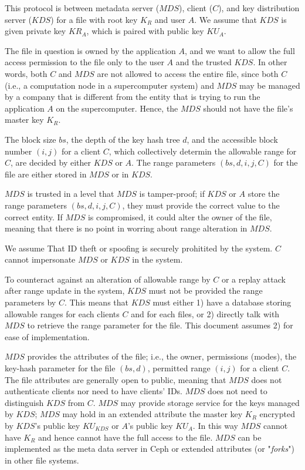 \documentclass[11pt]{article}
\newcommand{\mds}{\ensuremath{\mathit{MDS}}}
\newcommand{\kds}{\ensuremath{\mathit{KDS}}}
\begin{document}
This protocol is between metadata server ($\mds$), client ($C$), and
key distribution server ($\kds$) for a file with root key $K_R$ and
user $A$.  We assume that $\kds$ is given private key
$\textit{KR}_A$, which is paired with public key $\textit{KU}_A$.

\vspace{1ex}

The file in question is owned by the application $A$, and we want
to allow the full access permission to the file only to the
user $A$ and the trusted $\kds$.
In other words, both $C$ and $\mds$ are not
allowed to access the entire file, since both $C$ (i.e., a computation
node in a supercomputer system) and $\mds$ may be managed by a
company that is different from the entity that is trying to run
the application $A$ on the supercomputer.
Hence, the $\mds$ should not have the file's master key $K_R$.

The block size $bs$, the depth of the key hash tree $d$,
and the accessible block number $(i,j)$ for a client $C$,
which collectively determin the allowable range for $C$,
are decided by either $\kds$ or $A$.
The range parameters $(bs,d,i,j,C)$ for the file are
either stored in $\mds$ or in $\kds$.

$\mds$ is trusted in a level that $\mds$ is tamper-proof;
if $\kds$ or $A$ store the range parameters $(bs,d,i,j,C)$,
they must provide the correct value to the correct entity.
If $\mds$ is compromised, it could alter the owner of the file,
meaning that there is no point in worring about range alteration
in $\mds$.

We assume That ID theft or spoofing is securely prohitited by the system.
$C$ cannot impersonate $\mds$ or $\kds$ in the system.

To counteract against an alteration of allowable range by $C$ or
a replay attack after range update in the system,
$\kds$ must not be provided the range parameters by $C$.
This means that $\kds$ must either 1) have a database storing allowable
ranges for each clients $C$ and for each files, or
2) directly talk with $\mds$ to retrieve the range parameter for the file.
This document assumes 2) for ease of implementation.

$\mds$ provides the attributes of the file; i.e., the owner, permissions
(modes), the key-hash parameter for the file $(bs,d)$,
permitted range $(i,j)$ for a client $C$.
The file attributes are generally open to public, meaning that $\mds$
does not authenticate clients nor need to have clients' IDs.
$\mds$ does not need to distinguish $\kds$ from $C$.
$\mds$ may provide storage service for the keys managed by $\kds$;
$\mds$ may hold in an extended attribute the master key $K_R$
encrypted by $\kds$'s public key $KU_{\kds}$ or $A$'s public key $KU_{A}$.
In this way $\mds$ cannot have $K_R$ and hence cannot have
the full access to the file.
$\mds$ can be implemented as the meta data server in Ceph
or extended attributes (or "\textit{forks}") in other file systems.
\end{document}

